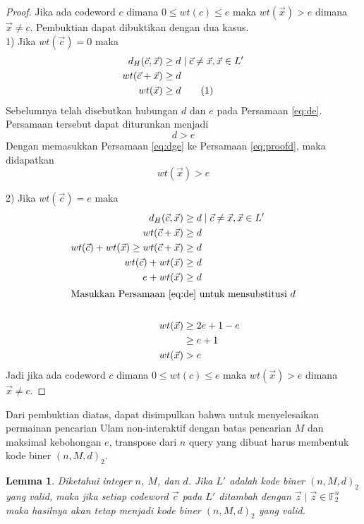 \documentclass[conference,compsoc]{IEEEtran}
\newtheorem{lemma}[theorem]{Lemma}
\newcommand{\refeq}[1]{Persamaan \ref{#1}}
\begin{document}
\begin{proof}
Jika ada codeword $c$ dimana $0 \le wt(c) \le e$ maka $wt(\vec{x}) > e$ dimana $\vec{x} \neq c$. Pembuktian dapat dibuktikan dengan dua kasus.\\

1) Jika $wt(\vec{c}) = 0$ maka
\begin{align*}
d_H(\vec{c},\vec{x}) &\ge d \mid \vec{c} \neq \vec{x} , \vec{x} \in L' \\
wt(\vec{c} + \vec{x}) &\ge d \\
wt(\vec{x}) &\ge d \label{eq:proofd} \stepcounter{equation} \tag{\theequation}
\end{align*}
Sebelumnya telah disebutkan hubungan $d$ dan $e$ pada \refeq{eq:de}. Persamaan tersebut dapat diturunkan menjadi
\begin{equation} \label{eq:dge}
d > e
\end{equation}
Dengan memasukkan \refeq{eq:dge} ke \refeq{eq:proofd}, maka didapatkan
\begin{equation*}
wt(\vec{x}) > e
\end{equation*}

2) Jika $wt(\vec{c}) = e$ maka
\begin{align*}
d_H(\vec{c},\vec{x}) &\ge d \mid \vec{c} \neq \vec{x} , \vec{x} \in L' \\
wt(\vec{c}+\vec{x}) &\ge d \\
wt(\vec{c}) + wt(\vec{x}) \ge wt(\vec{c}+\vec{x}) &\ge d \\
wt(\vec{c}) + wt(\vec{x}) &\ge d \\
e + wt(\vec{x}) &\ge d \\
\intertext{Masukkan \refeq{eq:de} untuk mensubstitusi $d$}\\
wt(\vec{x}) &\ge 2e+1-e \\
&\ge e+1\\
wt(\vec{x}) &> e
\end{align*}
Jadi jika ada codeword $c$ dimana $0 \le wt(c) \le e$ maka $wt(\vec{x}) > e$ dimana $\vec{x} \neq c$.
\end{proof}

Dari pembuktian diatas, dapat disimpulkan bahwa untuk menyelesaikan permainan pencarian Ulam non-interaktif dengan batas pencarian $M$ dan maksimal kebohongan $e$, transpose dari $n$ query yang dibuat harus membentuk kode biner $(n,M,d)_2$.

\begin{lemma}
Diketahui integer $n$, $M$, dan $d$. Jika $L'$ adalah kode biner $(n,M,d)_2$ yang valid, maka jika setiap codeword $\vec{c}$ pada $L'$ ditambah dengan $\vec{z} \mid \vec{z} \in \mathbb{F}_2^n$ maka hasilnya akan tetap menjadi kode biner $(n,M,d)_2$ yang valid.  
\end{lemma}
\end{document}
